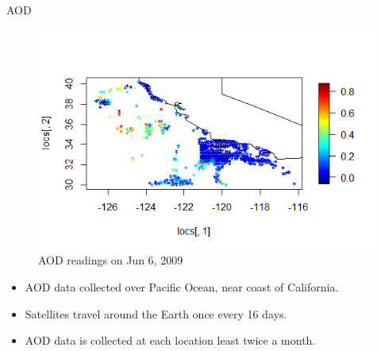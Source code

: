 \documentclass[notheorems,envcountsect,allowframebreaks,xcolor=svgnames,8pt]{beamer}
\begin{document}
\begin{frame}{AOD}
\begin{figure}[H]
\centering
\includegraphics[scale=0.5]{AODpoints_06012009.png}
\caption{AOD readings on Jun 6, 2009}
\label{fig:locations}
\end{figure}

\begin{itemize}	
\item AOD data collected over Pacific Ocean, near coast of California.
\item Satellites travel around the Earth once every 16 days.
\item AOD data is collected at each location least twice a month.
\end{itemize}		
\end{frame}

\end{document}
